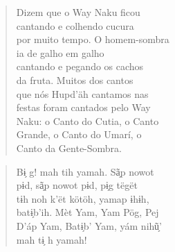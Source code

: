 \mbox{}\vspace*{\fill}

\begin{verse}
Dizem que o Way Naku ficou\\
cantando e colhendo cucura\\
por muito tempo. O homem-sombra\\
ia de galho em galho\\
cantando e pegando os cachos\\
da fruta. Muitos dos cantos\\
que nós Hupd’äh cantamos nas\\
festas foram cantados pelo Way\\
Naku: o Canto do Cutia, o Canto\\
Grande, o Canto do Umarí, o\\
Canto da Gente-Sombra.
\end{verse}

\begin{verse}
Bɨ̗ g! mah tih yamah. Sã̗p nowot\\
pɨd, sã̗p nowot pɨd, pɨ̗g tëgët\\
tɨh noh k’ët kötöh, yamap ɨhɨh,\\
batɨ̗b’ih. Mèt Yam, Yam Pög, Pej\\
D’áp Yam, Batɨ̗b’ Yam, yám nihũ̗’\\
mah tɨ̗ h yamah!
\end{verse}

\vspace*{\fill}

